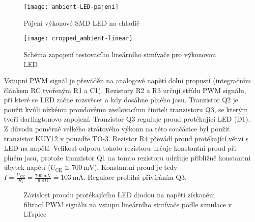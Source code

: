 \begin{figure}[htb]
    \centering
    \texttt{[image: ambient-LED-pajeni]}
    \caption{Pájení výkonové SMD LED na chladič}
    \label{fig:ambient LED pajeni}
\end{figure}



\begin{figure}[htb]
    \centering
    \texttt{[image: cropped\_ambient-linear]}
    \caption{Schéma zapojení testovacího lineárního stmívače pro výkonovou LED}
    \label{fig:ambient linear sch}
\end{figure}

Vstupní PWM signál je převáděn na analogové napětí dolní propustí (integračním
článkem RC tvořeným R1 a C1). Rezistory R2 a R3 určují střídu PWM
signálu, při které se LED začne rozsvěcet a kdy dosáhne plného jasu. Tranzistor
Q2 je použit kvůli nízkému proudovému zesilovacímu činiteli tranzistoru Q3, se
kterým tvoří darlingtonovo zapojení. Tranzistor Q3 reguluje proud protékající
LED (D1). Z důvodu poměrně velkého ztrátového výkonu na této součástce byl
použit tranzistor KUY12 v pouzdře TO-3. Rezistor R4 převádí proud protékající
větví s LED na napětí. Velikost odporu tohoto rezistoru určuje konstantní proud
při plném jasu, protože tranzistor Q1 na tomto rezistoru udržuje přibližně
konstantní úbytek napětí ($U_\mathrm{CE} \cong \SI{700}{\milli\volt}$).
Konstantní proud je tedy $I = \frac{U_\mathrm{CE}}{R_4} =
\frac{\SI{700}{\milli\volt}}{\SI{6,8}{\ohm}} \doteq \SI{103}{\milli\ampere}$.
Regulace probíhá přivíráním Q3.

\begin{figure}[htb]
    \centering
    
    \caption{%
        Závislost proudu protékajícího LED diodou na napětí získaném filtrací
        PWM signálu na vstupu lineárního stmívače
        podle simulace v LTspice
    }
    \label{fig:ambient linear napeti}
\end{figure}
